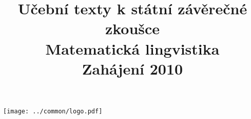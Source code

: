 \clearpage

\clearpage

\title{\LARGE Učební texty k státní závěrečné zkoušce \\ Matematická lingvistika \\ Zahájení 2010}




\maketitle

\vspace{10mm}
\begin{center}
\texttt{[image: ../common/logo.pdf]}
\end{center} 

\clearpage

\clearpage

\tableofcontents








